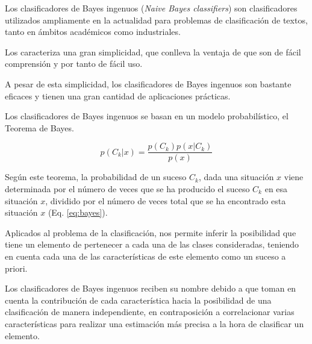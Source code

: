 Los clasificadores de Bayes ingenuos (\textit{Naive Bayes classifiers}) son clasificadores utilizados ampliamente en la actualidad para problemas de clasificación de textos, tanto en ámbitos académicos como industriales.

Los caracteriza una gran simplicidad, que conlleva la ventaja de que son de fácil comprensión y por tanto de fácil uso.

A pesar de esta simplicidad, los clasificadores de Bayes ingenuos son bastante eficaces y tienen una gran cantidad de aplicaciones prácticas.

Los clasificadores de Bayes ingenuos se basan en un modelo probabilístico, el Teorema de Bayes.

\begin{equation}\label{eq:bayes}
    p(C_k|x) = \frac{p(C_k)p(x|C_k)}{p(x)}
\end{equation}

Según este teorema, la probabilidad de un suceso $C_k$, dada una situación $x$ viene determinada por el número de veces que se ha producido el suceso $C_k$ en esa situación $x$, dividido por el número de veces total que se ha encontrado esta situación $x$
(Eq. \ref{eq:bayes}).

Aplicados al problema de la clasificación, nos permite inferir la posibilidad que tiene un elemento de pertenecer a cada una de las clases consideradas, teniendo en cuenta cada una de las características de este elemento como un suceso a priori.

Los clasificadores de Bayes ingenuos reciben su nombre debido a que toman en cuenta la contribución de cada característica hacia la posibilidad de una clasificación de manera independiente, en contraposición a correlacionar varias características para realizar una estimación más precisa a la hora de clasificar un elemento.